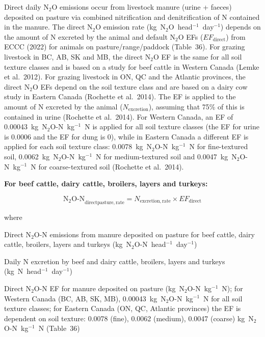 Direct daily N$_2$O emissions occur from livestock manure (urine + faeces)
deposited on pasture via combined nitrification and denitrification of N
contained in the manure. The direct N$_2$O emission rate
(kg~N$_2$O~head$^{-1}$~day$^{-1}$) depends on the amount of N excreted by the
animal and default N$_2$O EFs ($\mathit{EF}_{\mathrm{direct}}$) from ECCC (2022)
for animals on pasture/range/paddock (Table~36). For grazing livestock in BC,
AB, SK and MB, the direct N$_2$O EF is the same for all soil texture classes and
is based on a study for beef cattle in Western Canada (Lemke et al.\ 2012). For
grazing livestock in ON, QC and the Atlantic provinces, the direct N$_2$O EFs
depend on the soil texture class and are based on a dairy cow study in Eastern
Canada (Rochette et al.\ 2014). The EF is applied to the amount of N excreted by
the animal ($N_{\mathrm{excretion}}$), assuming that 75\% of this is contained in
urine (Rochette et al.\ 2014). For Western Canada, an EF of
0.00043~kg~N$_2$O-N~kg$^{-1}$~N is applied for all soil texture classes (the EF
for urine is 0.0006 and the EF for dung is 0), while in Eastern Canada a
different EF is applied for each soil texture class:
0.0078~kg~N$_2$O-N~kg$^{-1}$~N for fine-textured soil,
0.0062~kg~N$_2$O-N~kg$^{-1}$~N for medium-textured soil and
0.0047~kg~N$_2$O-N~kg$^{-1}$~N for coarse-textured soil (Rochette et al.\ 2014).

\bigskip
\noindent\textbf{For beef cattle, dairy cattle, broilers, layers and turkeys:}

\begin{equation}
    \mathrm{N_2O\text{-}N}_{\mathrm{directpasture,rate}}
        = N_{\mathrm{excretion,rate}} \times \mathit{EF}_{\mathrm{direct}}
    \tag{Eq.\ 5.3.1-1}
\end{equation}

\noindent where

\begin{description}[font=\normalfont, leftmargin=12em, style=nextline, nosep]
    \item[$\mathrm{N_2O\text{-}N}_{\mathrm{directpasture,rate}}$]
        Direct N$_2$O-N emissions from manure deposited on pasture for beef
        cattle, dairy cattle, broilers, layers and turkeys
        (kg~N$_2$O-N~head$^{-1}$~day$^{-1}$)
    \item[$N_{\mathrm{excretion,rate}}$]
        Daily N excretion by beef and dairy cattle, broilers, layers and turkeys
        (kg~N~head$^{-1}$~day$^{-1}$)
    \item[$\mathit{EF}_{\mathrm{direct}}$]
        Direct N$_2$O-N EF for manure deposited on pasture
        (kg~N$_2$O-N~kg$^{-1}$~N); for Western Canada (BC, AB, SK, MB),
        0.00043~kg~N$_2$O-N~kg$^{-1}$~N for all soil texture classes; for
        Eastern Canada (ON, QC, Atlantic provinces) the EF is dependent on soil
        texture: 0.0078 (fine), 0.0062 (medium), 0.0047 (coarse)
        kg~N$_2$O-N~kg$^{-1}$~N (Table~36)
\end{description}

